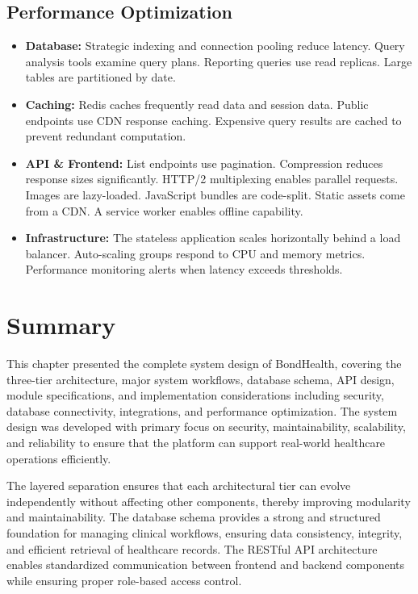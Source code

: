 \subsection{Performance Optimization}

\begin{itemize}
    \item \textbf{Database:} Strategic indexing and connection pooling reduce latency. Query analysis tools examine query plans. Reporting queries use read replicas. Large tables are partitioned by date.

    \item \textbf{Caching:} Redis caches frequently read data and session data. Public endpoints use CDN response caching. Expensive query results are cached to prevent redundant computation.

    \item \textbf{API \& Frontend:} List endpoints use pagination. Compression reduces response sizes significantly. HTTP/2 multiplexing enables parallel requests. Images are lazy-loaded. JavaScript bundles are code-split. Static assets come from a CDN. A service worker enables offline capability. \
    
    \item \textbf{Infrastructure:} The stateless application scales horizontally behind a load balancer. Auto-scaling groups respond to CPU and memory metrics. Performance monitoring alerts when latency exceeds thresholds.
\end{itemize}


\section{Summary}

\justifying
\noindent This chapter presented the complete system design of BondHealth, covering the three-tier architecture, major system workflows, database schema, API design, module specifications, and implementation considerations including security, database connectivity, integrations, and performance optimization. The system design was developed with primary focus on security, maintainability, scalability, and reliability to ensure that the platform can support real-world healthcare operations efficiently.

\justifying
\noindent The layered separation ensures that each architectural tier can evolve independently without affecting other components, thereby improving modularity and maintainability. The database schema provides a strong and structured foundation for managing clinical workflows, ensuring data consistency, integrity, and efficient retrieval of healthcare records. The RESTful API architecture enables standardized communication between frontend and backend components while ensuring proper role-based access control.

